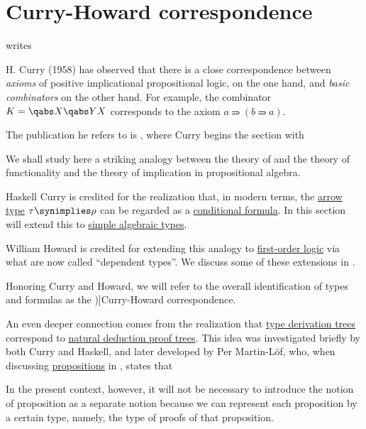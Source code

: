 \section{Curry-Howard correspondence}\label{sec:curry_howard_correspondence}

\begin{concept}\label{con:curry_howard_correspondence}
  \textcite[479]{Howard1980FormulasAsTypes} writes
  \begin{displayquote}
    H. Curry (1958) has observed that there is a close correspondence between \textit{axioms} of positive implicational propositional logic, on the one hand, and \textit{basic combinators} on the other hand. For example, the combinator \( K = \qabs X \qabs Y X \) corresponds to the axiom \( a \rightimply (b \rightimply a) \).
  \end{displayquote}

  The publication he refers to is \cite[312]{CurryFeysCraig1958CombinatoryLogicVol1}, where Curry begins the section with
  \begin{displayquote}
    We shall study here a striking analogy between the theory of and the theory of functionality and the theory of implication in propositional algebra.
  \end{displayquote}

  Haskell Curry is credited for the realization that, in modern terms, the \hyperref[def:arrow_type]{arrow type} \( \tau \synimplies \rho \) can be regarded as a \hyperref[def:propositional_alphabet/connectives/conditional]{conditional formula}. In this section will extend this to \hyperref[def:simple_algebraic_types]{simple algebraic types}.

  William Howard is credited for extending this analogy to \hyperref[sec:first_order_logic]{first-order logic} via what are now called \enquote{dependent types}. We discuss some of these extensions in .

  Honoring Curry and Howard, we will refer to the overall identification of types and formulas as the \term[en=Curry-Howard correspondence (\cite[def. 4.1.7]{Mimram2020ProgramEqualsProof})]{Curry-Howard correspondence}.

  An even deeper connection comes from the realization that \hyperref[def:type_derivation_tree]{type derivation trees} correspond to \hyperref[def:propositional_natural_deduction_proof_tree]{natural deduction proof trees}. This idea was investigated briefly by both Curry and Haskell, and later developed by Per Martin-L\"of, who, when discussing \hyperref[con:proposition]{propositions} in \cite[76]{MartinLöf1975IntuitionisticTypeTheory}, states that
  \begin{displayquote}
    In the present context, however, it will not be necessary to introduce the notion of proposition as a separate notion because we can represent each proposition by a certain type, namely, the type of proofs of that proposition.
  \end{displayquote}
\end{concept}
